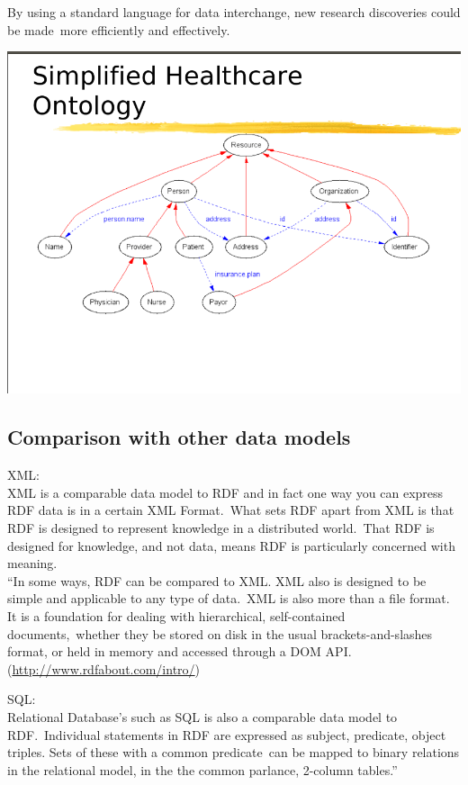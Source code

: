 \documentclass[DIV=calc, paper=a4, fontsize=12pt, onecolumn]{scrartcl}	 %
\begin{document}
By using a standard language for data interchange, new research discoveries could be made\
more efficiently and effectively.\

\includegraphics[scale=0.4]{rdf1.png}

\subsection{Comparison with other data models}

XML:\\

XML is a comparable data model to RDF and in fact one way you can express RDF data is in a certain XML Format.\
What sets RDF apart from XML is that RDF is designed to represent knowledge in a distributed world.\
That RDF is designed for knowledge, and not data, means RDF is particularly concerned with meaning.\\

“In some ways, RDF can be compared to XML. XML also is designed to be simple and applicable to any type of data.\
XML is also more than a file format. It is a foundation for dealing with hierarchical, self-contained documents,\
 whether they be stored on disk in the usual brackets-and-slashes format, or held in memory and accessed through a DOM API.\\

 (\url{http://www.rdfabout.com/intro/})\

SQL: \\

Relational Database’s such as SQL is also a comparable data model to RDF.\
Individual statements in RDF are expressed as subject, predicate, object triples. Sets of these with a common predicate\
 can be mapped to binary relations in the relational model, in the the common parlance, 2-column tables.”\\
\end{document}
